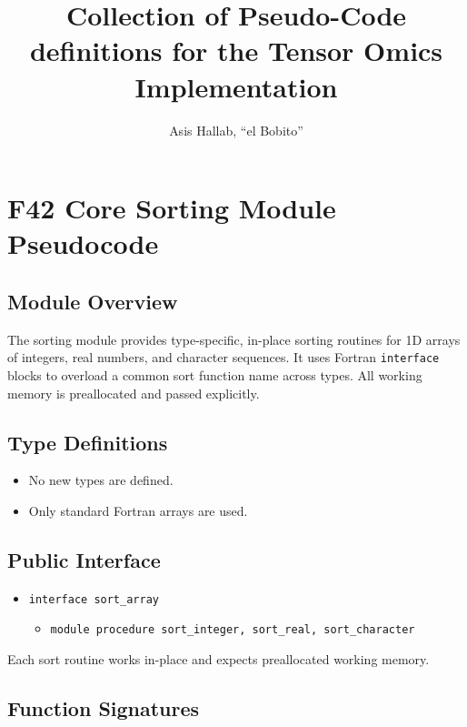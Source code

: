 \documentclass{article}
\title{Collection of Pseudo-Code definitions for the Tensor Omics
  Implementation}
\author{Asis Hallab, ``el Bobito''}
\begin{document}
\maketitle

\section{F42 Core Sorting Module Pseudocode}

\subsection{Module Overview}

The sorting module provides type-specific, in-place sorting routines for 1D arrays of integers, real numbers, and character sequences.
It uses Fortran \texttt{interface} blocks to overload a common sort function name across types.
All working memory is preallocated and passed explicitly.

\subsection{Type Definitions}

\begin{itemize}
    \item No new types are defined.
    \item Only standard Fortran arrays are used.
\end{itemize}

\subsection{Public Interface}

\begin{itemize}
    \item \texttt{interface sort\_array}
    \begin{itemize}
        \item \texttt{module procedure sort\_integer, sort\_real, sort\_character}
    \end{itemize}
\end{itemize}

Each sort routine works in-place and expects preallocated working memory.

\subsection{Function Signatures}
\end{document}
